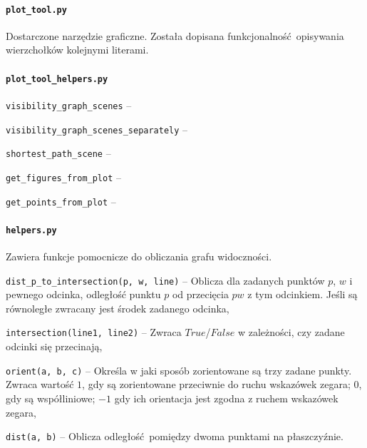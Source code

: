 \documentclass[12pt]{article}
\let\tempone\itemize
\let\temptwo\enditemize
\renewenvironment{itemize}{\tempone\setlength{\itemsep}{0cm}}{\temptwo}
\begin{document}
	\paragraph{\lstinline|plot_tool.py|}
		Dostarczone narzędzie graficzne. Została dopisana funkcjonalność opisywania wierzchołków kolejnymi literami.
	
	\paragraph{\lstinline|plot_tool_helpers.py|}
		\begin{itemize}
			\item \lstinline|visibility_graph_scenes| -- 
			\item \lstinline|visibility_graph_scenes_separately| -- 
			\item \lstinline|shortest_path_scene| -- 
			\item \lstinline|get_figures_from_plot| -- 
			\item \lstinline|get_points_from_plot| -- 
		\end{itemize}
	
	\paragraph{\lstinline|helpers.py|}
		Zawiera funkcje pomocnicze do obliczania grafu widoczności.
		\begin{itemize}
			\item \lstinline|dist_p_to_intersection(p, w, line)| -- Oblicza dla zadanych punktów $ p $, $ w $ i pewnego odcinka, odległość punktu $ p $ od przecięcia $ pw $ z tym odcinkiem. Jeśli są równoległe zwracany jest środek zadanego odcinka,\\
			\item \lstinline|intersection(line1, line2)| -- Zwraca $ True $/$ False $ w zależności, czy zadane odcinki się przecinają,\\
			\item \lstinline|orient(a, b, c)| -- Określa w jaki sposób zorientowane są trzy zadane punkty. Zwraca wartość $ 1 $, gdy są zorientowane przeciwnie do ruchu wskazówek zegara; $ 0 $, gdy są współliniowe; $ -1 $ gdy ich orientacja jest zgodna z ruchem wskazówek zegara,\\
			\item \lstinline|dist(a, b)| -- Oblicza odległość pomiędzy dwoma punktami na płaszczyźnie.
		\end{itemize}
\end{document}
